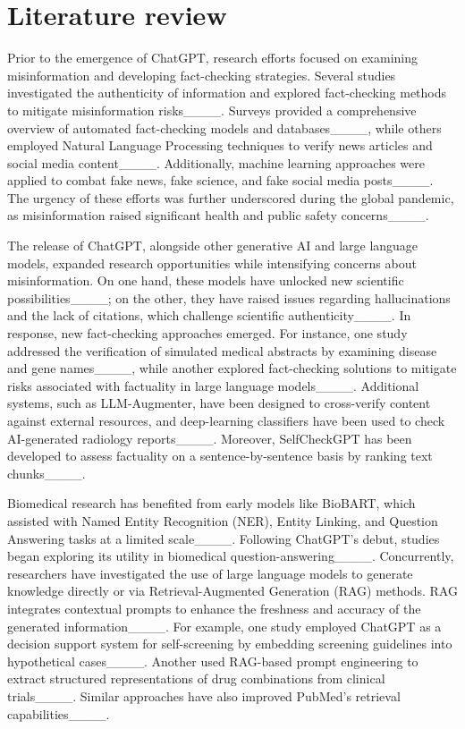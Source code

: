 \section{Literature review}
Prior to the emergence of ChatGPT, research efforts focused on examining misinformation and developing fact-checking strategies. Several studies investigated the authenticity of information and explored fact-checking methods to mitigate misinformation risks____. Surveys provided a comprehensive overview of automated fact-checking models and databases____, while others employed Natural Language Processing techniques to verify news articles and social media content____. Additionally, machine learning approaches were applied to combat fake news, fake science, and fake social media posts____. The urgency of these efforts was further underscored during the global pandemic, as misinformation raised significant health and public safety concerns____.

The release of ChatGPT, alongside other generative AI and large language models, expanded research opportunities while intensifying concerns about misinformation. On one hand, these models have unlocked new scientific possibilities____; on the other, they have raised issues regarding hallucinations and the lack of citations, which challenge scientific authenticity____. In response, new fact-checking approaches emerged. For instance, one study addressed the verification of simulated medical abstracts by examining disease and gene names____, while another explored fact-checking solutions to mitigate risks associated with factuality in large language models____. Additional systems, such as LLM-Augmenter, have been designed to cross-verify content against external resources, and deep-learning classifiers have been used to check AI-generated radiology reports____. Moreover, SelfCheckGPT has been developed to assess factuality on a sentence-by-sentence basis by ranking text chunks____.

Biomedical research has benefited from early models like BioBART, which assisted with Named Entity Recognition (NER), Entity Linking, and Question Answering tasks at a limited scale____. Following ChatGPT’s debut, studies began exploring its utility in biomedical question-answering____. Concurrently, researchers have investigated the use of large language models to generate knowledge directly or via Retrieval-Augmented Generation (RAG) methods. RAG integrates contextual prompts to enhance the freshness and accuracy of the generated information____. For example, one study employed ChatGPT as a decision support system for self-screening by embedding screening guidelines into hypothetical cases____. Another used RAG-based prompt engineering to extract structured representations of drug combinations from clinical trials____. Similar approaches have also improved PubMed’s retrieval capabilities____.

